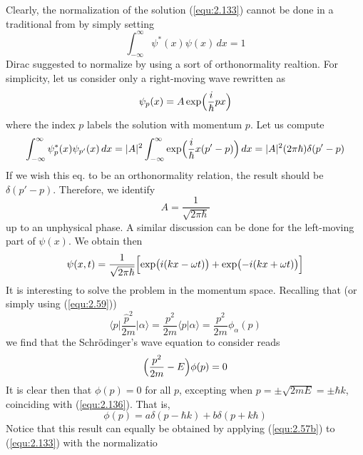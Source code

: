 Clearly, the normalization of the solution (\ref{equ:2.133})
cannot be done in a traditional from by simply setting
$$
\int_{-\infty}^{\infty} \psi^*(x) \psi(x)\, dx = 1
$$
Dirac suggested to normalize by using a sort of
orthonormality realtion. For simplicity, let us consider
only a right-moving wave rewritten as
\begin{equation}
  \psi_p(x) = A \exp\Bigl(\frac{i}{\hbar}px\Bigr)
  \label{equ:2.137}
\end{equation}
where the index $p$ labels the solution with momentum $p$.
Let us compute
\begin{equation}
  \int_{-\infty}^{\infty} \psi_p^*(x) \psi_{p'}(x) \, dx =
  \vert A\vert ^2 \int_{-\infty}^{\infty}
  \exp\Bigl(\frac{i}{\hbar}x(p'-p)\Bigr) \, dx = \vert A\vert ^2
  (2\pi\hbar)\delta(p'-p)
  \label{equ:2.138}
\end{equation}
If we wish this eq. to be an orthonormality relation, the
result should be $\delta(p'-p)$. Therefore, we identify
\begin{equation}
  A = \frac{1}{\sqrt{2\pi\hbar}}
  \label{equ:2.139}
\end{equation}
up to an unphysical phase. A similar discussion can be done
for the left-moving part of $\psi(x)$. We obtain then
\begin{equation}
  \psi(x,t) = \frac{1}{\sqrt{2\pi\hbar}}
  \Bigl[
    \exp\bigl(i(kx-\omega t)\bigr) +
    \exp\bigl(-i(kx+\omega t)\bigr)
  \Bigr]
  \label{equ:2.140}
\end{equation}
It is interesting to solve the problem in the momentum
space. Recalling that (or simply using (\ref{equ:2.59}))
\begin{equation}
  \langle p\vert \frac{\hat{p}^2}{2m}\vert \alpha\rangle  =
  \frac{p^2}{2m} \langle p\vert \alpha\rangle  = \frac{p^2}{2m} \phi_{\alpha}(p)
  \label{equ:2.141}
\end{equation}
we find that the Schrödinger's wave equation to consider
reads
\begin{equation}
  \Bigl(\frac{p^2}{2m}-E\Bigr)
  \phi(p) = 0
  \label{equ:2.142}
\end{equation}
It is clear then that $\phi(p) = 0$ for all $p$, excepting
when $p = \pm \sqrt{2mE} = \pm \hbar k$, coinciding with
(\ref{equ:2.136}). That is,
\begin{equation}
  \phi(p) = a \delta(p - \hbar k) + b \delta (p+k\hbar)
  \label{equ:2.143}
\end{equation}
Notice that this result can equally be obtained by applying
(\ref{equ:2.57b}) to (\ref{equ:2.133}) with the normalizatio
